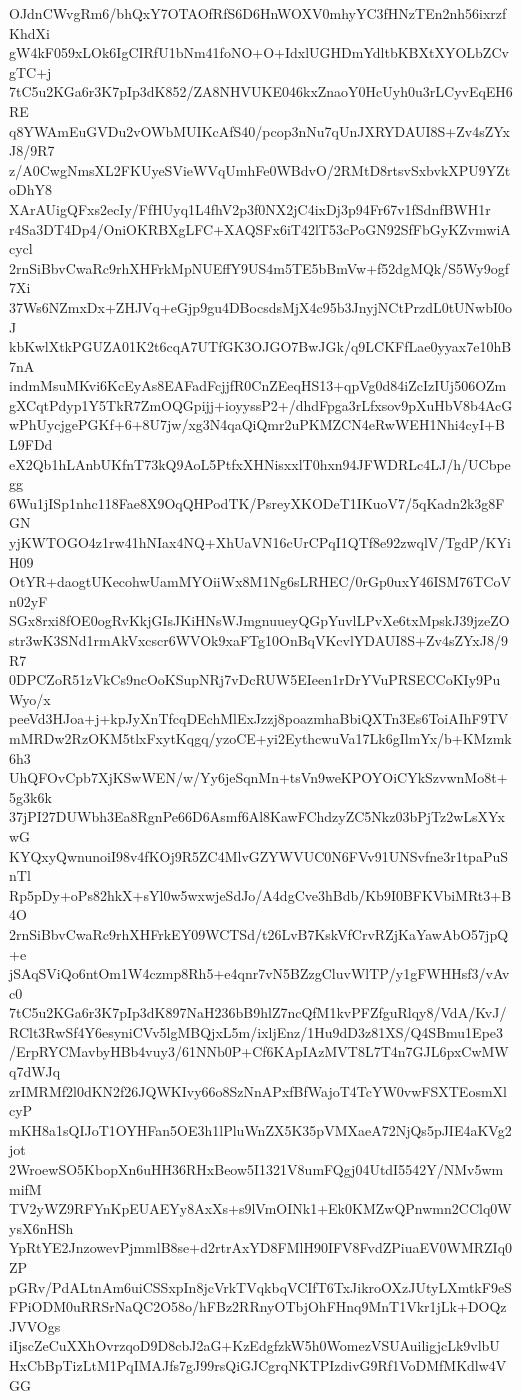 OJdnCWvgRm6/bhQxY7OTAOfRfS6D6HnWOXV0mhyYC3fHNzTEn2nh56ixrzfKhdXi
gW4kF059xLOk6IgCIRfU1bNm41foNO+O+IdxlUGHDmYdltbKBXtXYOLbZCvgTC+j
7tC5u2KGa6r3K7pIp3dK852/ZA8NHVUKE046kxZnaoY0HcUyh0u3rLCyvEqEH6RE
q8YWAmEuGVDu2vOWbMUIKcAfS40/pcop3nNu7qUnJXRYDAUI8S+Zv4sZYxJ8/9R7
z/A0CwgNmsXL2FKUyeSVieWVqUmhFe0WBdvO/2RMtD8rtsvSxbvkXPU9YZtoDhY8
XArAUigQFxs2ecIy/FfHUyq1L4fhV2p3f0NX2jC4ixDj3p94Fr67v1fSdnfBWH1r
r4Sa3DT4Dp4/OniOKRBXgLFC+XAQSFx6iT42lT53cPoGN92SfFbGyKZvmwiAcycl
2rnSiBbvCwaRc9rhXHFrkMpNUEffY9US4m5TE5bBmVw+f52dgMQk/S5Wy9ogf7Xi
37Ws6NZmxDx+ZHJVq+eGjp9gu4DBocsdsMjX4c95b3JnyjNCtPrzdL0tUNwbI0oJ
kbKwlXtkPGUZA01K2t6cqA7UTfGK3OJGO7BwJGk/q9LCKFfLae0yyax7e10hB7nA
indmMsuMKvi6KcEyAs8EAFadFcjjfR0CnZEeqHS13+qpVg0d84iZcIzIUj506OZm
gXCqtPdyp1Y5TkR7ZmOQGpijj+ioyyssP2+/dhdFpga3rLfxsov9pXuHbV8b4AcG
wPhUycjgePGKf+6+8U7jw/xg3N4qaQiQmr2uPKMZCN4eRwWEH1Nhi4cyI+BL9FDd
eX2Qb1hLAnbUKfnT73kQ9AoL5PtfxXHNisxxlT0hxn94JFWDRLc4LJ/h/UCbpegg
6Wu1jISp1nhc118Fae8X9OqQHPodTK/PsreyXKODeT1IKuoV7/5qKadn2k3g8FGN
yjKWTOGO4z1rw41hNIax4NQ+XhUaVN16cUrCPqI1QTf8e92zwqlV/TgdP/KYiH09
OtYR+daogtUKecohwUamMYOiiWx8M1Ng6sLRHEC/0rGp0uxY46ISM76TCoVn02yF
SGx8rxi8fOE0ogRvKkjGIsJKiHNsWJmgnuueyQGpYuvlLPvXe6txMpskJ39jzeZO
str3wK3SNd1rmAkVxcscr6WVOk9xaFTg10OnBqVKcvlYDAUI8S+Zv4sZYxJ8/9R7
0DPCZoR51zVkCs9ncOoKSupNRj7vDcRUW5EIeen1rDrYVuPRSECCoKIy9PuWyo/x
peeVd3HJoa+j+kpJyXnTfcqDEchMlExJzzj8poazmhaBbiQXTn3Es6ToiAIhF9TV
mMRDw2RzOKM5tlxFxytKqgq/yzoCE+yi2EythcwuVa17Lk6gIlmYx/b+KMzmk6h3
UhQFOvCpb7XjKSwWEN/w/Yy6jeSqnMn+tsVn9weKPOYOiCYkSzvwnMo8t+5g3k6k
37jPI27DUWbh3Ea8RgnPe66D6Asmf6Al8KawFChdzyZC5Nkz03bPjTz2wLsXYxwG
KYQxyQwnunoiI98v4fKOj9R5ZC4MlvGZYWVUC0N6FVv91UNSvfne3r1tpaPuSnTl
Rp5pDy+oPs82hkX+sYl0w5wxwjeSdJo/A4dgCve3hBdb/Kb9I0BFKVbiMRt3+B4O
2rnSiBbvCwaRc9rhXHFrkEY09WCTSd/t26LvB7KskVfCrvRZjKaYawAbO57jpQ+e
jSAqSViQo6ntOm1W4czmp8Rh5+e4qnr7vN5BZzgCluvWlTP/y1gFWHHsf3/vAvc0
7tC5u2KGa6r3K7pIp3dK897NaH236bB9hlZ7ncQfM1kvPFZfguRlqy8/VdA/KvJ/
RClt3RwSf4Y6esyniCVv5lgMBQjxL5m/ixljEnz/1Hu9dD3z81XS/Q4SBmu1Epe3
/ErpRYCMavbyHBb4vuy3/61NNb0P+Cf6KApIAzMVT8L7T4n7GJL6pxCwMWq7dWJq
zrIMRMf2l0dKN2f26JQWKIvy66o8SzNnAPxfBfWajoT4TcYW0vwFSXTEosmXlcyP
mKH8a1sQIJoT1OYHFan5OE3h1lPluWnZX5K35pVMXaeA72NjQs5pJIE4aKVg2jot
2WroewSO5KbopXn6uHH36RHxBeow5I1321V8umFQgj04UtdI5542Y/NMv5wmmifM
TV2yWZ9RFYnKpEUAEYy8AxXs+s9lVmOINk1+Ek0KMZwQPnwmn2CClq0WysX6nHSh
YpRtYE2JnzowevPjmmlB8se+d2rtrAxYD8FMlH90IFV8FvdZPiuaEV0WMRZIq0ZP
pGRv/PdALtnAm6uiCSSxpIn8jcVrkTVqkbqVCIfT6TxJikroOXzJUtyLXmtkF9eS
FPiODM0uRRSrNaQC2O58o/hFBz2RRnyOTbjOhFHnq9MnT1Vkr1jLk+DOQzJVVOgs
iIjscZeCuXXhOvrzqoD9D8cbJ2aG+KzEdgfzkW5h0WomezVSUAuiligjcLk9vlbU
HxCbBpTizLtM1PqIMAJfs7gJ99rsQiGJCgrqNKTPIzdivG9Rf1VoDMfMKdlw4VGG
